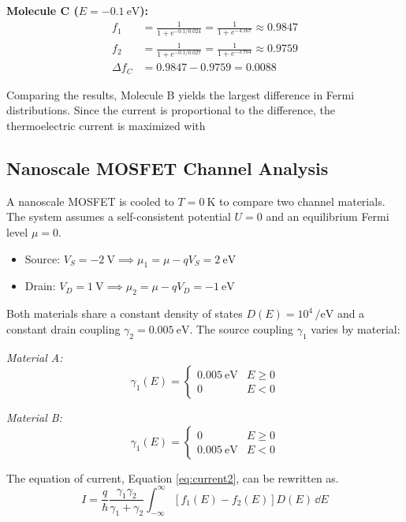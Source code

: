 \documentclass[a4paper, 10pt]{article}
\begin{document}
\noindent \textbf{Molecule C ($E = \SI{-0.1}{\eV}$):}
\begin{align*}
    f_1 &= \frac{1}{1 + e^{-0.1/0.024}} = \frac{1}{1 + e^{-4.167}} \approx 0.9847 \\
    f_2 &= \frac{1}{1 + e^{-0.1/0.027}} = \frac{1}{1 + e^{-3.704}} \approx 0.9759 \\
    \Delta f_C &= 0.9847 - 0.9759 = 0.0088
\end{align*}

\noindent Comparing the results, Molecule B yields the largest difference in Fermi distributions. Since the current is proportional to the difference, the thermoelectric current is maximized with 

\subsection{Nanoscale MOSFET Channel Analysis}
A nanoscale MOSFET is cooled to $T = \SI{0}{\kelvin}$ to compare two channel materials. The system assumes a self-consistent potential $U = 0$ and an equilibrium Fermi level $\mu = 0$.

\begin{itemize}
    \item Source: $V_S = \SI{-2}{\volt} \implies \mu_1 = \mu - qV_S = \SI{+2}{\eV}$
    \item Drain: $V_D = \SI{1}{\volt} \implies \mu_2 = \mu - qV_D = \SI{-1}{\eV}$
\end{itemize}

\noindent Both materials share a constant density of states $D(E) = 10^4 \, \si{\per\eV}$ and a constant drain coupling $\gamma_2 = \SI{0.005}{\eV}$. The source coupling $\gamma_1$ varies by material:

\noindent \textit{Material A:}
\[
    \gamma_1(E) = \begin{cases} \SI{0.005}{\eV} & E \ge 0 \\ 0 & E < 0 \end{cases}
\]

\noindent \textit{Material B:}
\[
    \gamma_1(E) = \begin{cases} 0 & E \ge 0 \\ \SI{0.005}{\eV} & E < 0 \end{cases}
\]

\noindent The equation of current, Equation \ref{eq:current2}, can be rewritten as.
\[
    I = \frac{q}{\hbar}
    \frac{\gamma_1 \gamma_2}{\gamma_1 + \gamma_2}
    \int_{-\infty}^{\infty}
    [f_1(E) - f_2(E)] D(E)\, \dd{E}
\]
\end{document}
